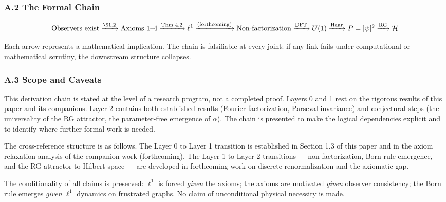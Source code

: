 \documentclass[
]{article}
\begin{document}
\subsubsection{A.2 The Formal Chain}\label{a.2-the-formal-chain}

\[\text{Observers exist} \xrightarrow{\S 1.2} \text{Axioms 1--4} \xrightarrow{\text{Thm 4.2}} \ell^1 \xrightarrow{\text{(forthcoming)}} \text{Non-factorization} \xrightarrow{\text{DFT}} U(1) \xrightarrow{\text{Haar}} P = |\psi|^2 \xrightarrow{\text{RG}} \mathcal{H}\]

Each arrow represents a mathematical implication. The chain is
falsifiable at every joint: if any link fails under computational or
mathematical scrutiny, the downstream structure collapses.

\subsubsection{A.3 Scope and Caveats}\label{a.3-scope-and-caveats}

This derivation chain is stated at the level of a research program, not
a completed proof. Layers 0 and 1 rest on the rigorous results of this
paper and its companions. Layer 2 contains both established results
(Fourier factorization, Parseval invariance) and conjectural steps (the
universality of the RG attractor, the parameter-free emergence of
\(\alpha\)). The chain is presented to make the logical dependencies
explicit and to identify where further formal work is needed.

The cross-reference structure is as follows. The Layer 0 to Layer 1
transition is established in Section 1.3 of this paper and in the axiom
relaxation analysis of the companion work (forthcoming). The Layer 1 to
Layer 2 transitions --- non-factorization, Born rule emergence, and the
RG attractor to Hilbert space --- are developed in forthcoming work on
discrete renormalization and the axiomatic gap.

The conditionality of all claims is preserved: \(\ell^1\) is forced
\emph{given} the axioms; the axioms are motivated \emph{given} observer
consistency; the Born rule emerges \emph{given} \(\ell^1\) dynamics on
frustrated graphs. No claim of unconditional physical necessity is made.
\end{document}
